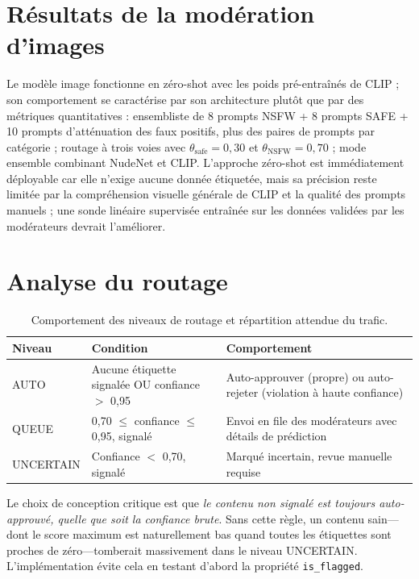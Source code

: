 \section{Résultats de la modération d'images}

Le modèle image fonctionne en zéro-shot avec les poids pré-entraînés de CLIP ; son comportement se caractérise par son architecture plutôt que par des métriques quantitatives : ensembliste de 8 prompts NSFW + 8 prompts SAFE + 10 prompts d'atténuation des faux positifs, plus des paires de prompts par catégorie ; routage à trois voies avec $\theta_{\text{safe}} = 0{,}30$ et $\theta_{\text{NSFW}} = 0{,}70$ ; mode ensemble combinant NudeNet et CLIP. L'approche zéro-shot est immédiatement déployable car elle n'exige aucune donnée étiquetée, mais sa précision reste limitée par la compréhension visuelle générale de CLIP et la qualité des prompts manuels ; une sonde linéaire supervisée entraînée sur les données validées par les modérateurs devrait l'améliorer.

\section{Analyse du routage}

\begin{table}[H]
\centering
\caption{Comportement des niveaux de routage et répartition attendue du trafic.}
\label{tab:routing_tiers}
\begin{tabularx}{\textwidth}{llX}
\toprule
\textbf{Niveau} & \textbf{Condition} & \textbf{Comportement} \\
\midrule
AUTO & Aucune étiquette signalée OU confiance $>$ 0,95 & Auto-approuver (propre) ou auto-rejeter (violation à haute confiance) \\
QUEUE & 0,70 $\leq$ confiance $\leq$ 0,95, signalé & Envoi en file des modérateurs avec détails de prédiction \\
UNCERTAIN & Confiance $<$ 0,70, signalé & Marqué incertain, revue manuelle requise \\
\bottomrule
\end{tabularx}
\end{table}

Le choix de conception critique est que \emph{le contenu non signalé est toujours auto-approuvé, quelle que soit la confiance brute}. Sans cette règle, un contenu sain---dont le score maximum est naturellement bas quand toutes les étiquettes sont proches de zéro---tomberait massivement dans le niveau UNCERTAIN. L'implémentation évite cela en testant d'abord la propriété \texttt{is\_flagged}.

